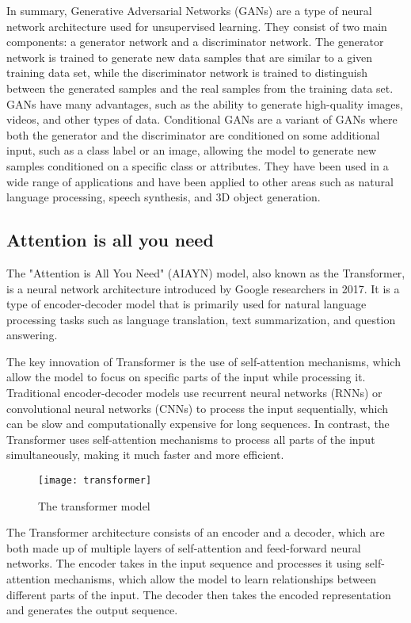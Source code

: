 In summary, Generative Adversarial Networks (GANs) are a type of neural network architecture used for unsupervised learning.
They consist of two main components: a generator network and a discriminator network.
The generator network is trained to generate new data samples that are similar to a given training data set, while the discriminator network is trained to distinguish between the generated samples and the real samples from the training data set.
GANs have many advantages, such as the ability to generate high-quality images, videos, and other types of data.
Conditional GANs are a variant of GANs where both the generator and the discriminator are conditioned on some additional input, such as a class label or an image, allowing the model to generate new samples conditioned on a specific class or attributes.
They have been used in a wide range of applications and have been applied to other areas such as natural language processing, speech synthesis, and 3D object generation.

\subsection{Attention is all you need}

The "Attention is All You Need" (AIAYN) \cite{vaswani} model, also known as the Transformer, is a neural network architecture introduced by Google researchers in 2017.
It is a type of encoder-decoder model that is primarily used for natural language processing tasks such as language translation, text summarization, and question answering.

The key innovation of Transformer is the use of self-attention mechanisms, which allow the model to focus on specific parts of the input while processing it.
Traditional encoder-decoder models use recurrent neural networks (RNNs) or convolutional neural networks (CNNs) to process the input sequentially, which can be slow and computationally expensive for long sequences.
In contrast, the Transformer uses self-attention mechanisms to process all parts of the input simultaneously, making it much faster and more efficient.

\begin{figure}[H]
  \centering
  \texttt{[image: transformer]}
  \caption{The transformer model \cite{vaswani}}
\end{figure}

The Transformer architecture consists of an encoder and a decoder, which are both made up of multiple layers of self-attention and feed-forward neural networks.
The encoder takes in the input sequence and processes it using self-attention mechanisms, which allow the model to learn relationships between different parts of the input.
The decoder then takes the encoded representation and generates the output sequence.

